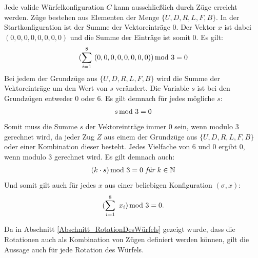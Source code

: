 \documentclass[12pt,a4paper, usenames, dvipsnames]{article}
\theoremstyle{mystyle}
\theoremstyle{definition}
\newcommand{\Gtwo}{\ensuremath{G_{2\times 2\times 2}}}
\begin{document}
Jede valide Würfelkonfiguration $C$ kann ausschließlich durch Züge erreicht werden. Züge bestehen aus Elementen der Menge $\{U, D, R, L, F, B\}$. In der Startkonfiguration ist der Summe der Vektoreinträge $0$. Der Vektor $x$ ist dabei $(0,0,0,0,0,0,0,0)$ und die Summe der Einträge ist somit 0. Es gilt:
\begin{align*}
(\sum_{i= 1}^{8} \ (0,0,0,0,0,0,0,0)) \hspace*{-0.5em} \mod 3 = 0
\end{align*}
Bei jedem der Grundzüge aus $\{U, D, R, L, F, B\}$ wird die Summe der Vektoreinträge um den Wert von $s$ verändert. Die Variable $s$ ist bei den Grundzügen entweder 0 oder 6. Es gilt demnach  für jedes mögliche $s$:
\begin{align*}
s \hspace*{-0.5em} \mod 3 = 0
\end{align*}
Somit muss die Summe $s$ der Vektoreinträge immer 0 sein, wenn modulo 3 gerechnet wird, da jeder Zug $Z$ aus einem der Grundzüge aus $\{U, D, R, L, F, B\}$ oder einer Kombination dieser besteht. Jedes Vielfache von 6 und 0 ergibt 0, wenn modulo 3 gerechnet wird. Es gilt demnach auch:
\begin{align*}
(k \cdot s) \hspace*{-0.5em} \mod 3 = 0 \textit{ für } k \in \mathbb{N}
\end{align*}
Und somit gilt auch für jedes $x$ aus einer beliebigen Konfiguration $(\sigma, x)$:
\begin{align*}
(\sum_{i= 1}^{8} \  x_i) \hspace*{-0.5em} \mod 3 = 0.
\end{align*}

Da in Abschnitt \ref{Abschnitt_RotationDesWürfels} gezeigt wurde, dass die Rotationen auch als Kombination von Zügen definiert werden können, gilt die Aussage auch für jede Rotation des Würfels.


%
%
%
%
%
%
%
%
%
%
%
%
%
%
%
%
%
%
%
%
\newpage
\end{document}
